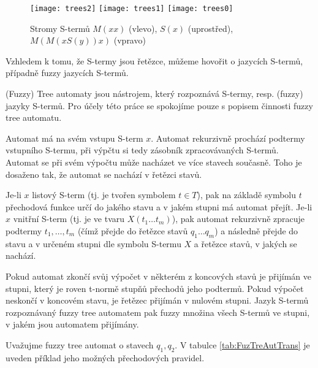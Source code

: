 \documentclass[a4paper,10pt]{article}
\begin{document}
\begin{figure}
  \centering
   \hfill
   \texttt{[image: trees2]} 
   \hfill
   \texttt{[image: trees1]}
   \hfill
   \texttt{[image: trees0]}
   \hfill
 \caption{Stromy S-termů $M(xx)$ (vlevo), $S(x)$ (uprostřed), $M(M(x S(y)) x)$ (vpravo)} \label{img:Tree}
\end{figure}

Vzhledem k tomu, že S-termy jsou řetězce, můžeme hovořit o jazycích S-termů, případně fuzzy jazycích S-termů. 

(Fuzzy) Tree automaty jsou nástrojem, který rozpoznává S-termy, resp. (fuzzy) jazyky S-termů. Pro účely této práce se spokojíme pouze s popisem činnosti fuzzy tree automatu. 

Automat má na svém vstupu S-term $x$. Automat rekurzivně prochází podtermy vstupního S-termu, při výpčtu si tedy zásobník zpracovávaných S-termů. Automat se při svém výpočtu může nacházet ve více stavech současně. Toho je dosaženo tak, že automat se nachází v řetězci stavů. 

Je-li $x$ listový S-term (tj. je tvořen symbolem $t \in T$), pak na základě symbolu $t$ přechodová funkce určí do jakého stavu a v jakém stupni má automat přejít. Je-li $x$ vnitřní S-term (tj. je ve tvaru $X(t_1 \dots t_m)$), pak automat rekurzivně zpracuje podtermy $t_1, \dots, t_m$ (čímž přejde do řetězce stavů $q_1 \dots q_m$) a následně přejde do stavu a v určeném stupni dle symbolu S-termu $X$ a řetězce stavů, v jakých se nachází.

Pokud automat zkončí svůj výpočet v některém z koncových stavů je přijímán ve stupni, který je roven t-normě stupňů přechodů jeho podtermů. Pokud výpočet neskončí v koncovém stavu, je řetězec přijímán v nulovém stupni. Jazyk S-termů rozpoznávaný fuzzy tree automatem pak fuzzy množina všech S-termů ve stupni, v jakém jsou automatem přijímány.

\begin{example}
  Uvažujme fuzzy tree automat o stavech $q_1, q_2$. V tabulce \ref{tab:FuzTreAutTrans} je uveden příklad jeho možných přechodových pravidel.
\end{example}
\end{document}
